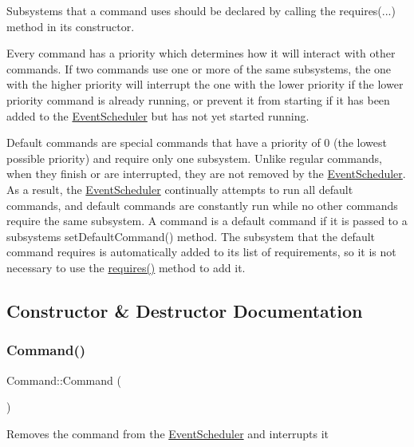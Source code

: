 Subsystems that a command uses should be declared by calling the requires(...) method in its constructor.

Every command has a priority which determines how it will interact with other commands. If two commands use one or more of the same subsystems, the one with the higher priority will interrupt the one with the lower priority if the lower priority command is already running, or prevent it from starting if it has been added to the \mbox{\hyperlink{classlib_iterative_robot_1_1_event_scheduler}{Event\+Scheduler}} but has not yet started running.

Default commands are special commands that have a priority of 0 (the lowest possible priority) and require only one subsystem. Unlike regular commands, when they finish or are interrupted, they are not removed by the \mbox{\hyperlink{classlib_iterative_robot_1_1_event_scheduler}{Event\+Scheduler}}. As a result, the \mbox{\hyperlink{classlib_iterative_robot_1_1_event_scheduler}{Event\+Scheduler}} continually attempts to run all default commands, and default commands are constantly run while no other commands require the same subsystem. A command is a default command if it is passed to a subsystem\textquotesingle{}s set\+Default\+Command() method. The subsystem that the default command requires is automatically added to its list of requirements, so it is not necessary to use the \mbox{\hyperlink{classlib_iterative_robot_1_1_command_ad7b7f328974f5f17a2a4b1593b6c9eb5}{requires()}} method to add it. 

\subsection{Constructor \& Destructor Documentation}
\mbox{\label{classlib_iterative_robot_1_1_command_a18df2d81039392daeb0b78c346a70537}} 
\subsubsection{\texorpdfstring{Command()}{Command()}}
{\footnotesize\ttfamily Command\+::\+Command (\begin{DoxyParamCaption}{ }\end{DoxyParamCaption})}

Removes the command from the \mbox{\hyperlink{classlib_iterative_robot_1_1_event_scheduler}{Event\+Scheduler}} and interrupts it 


